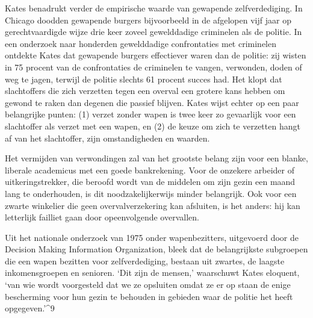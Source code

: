 \documentclass[
  a5paper,
  smalldemyvopaper,10pt,twoside,onecolumn,openright,extrafontsizes,hidelinks]{memoir}
\renewenvironment{quote}%
               {\list{}{\rightmargin=.6cm\leftmargin=.6cm}%
                \itshape \item[]}%
               {\endlist}
\begin{document}
Kates benadrukt verder de empirische waarde van gewapende
zelfverdediging. In Chicago doodden gewapende burgers bijvoorbeeld in de
afgelopen vijf jaar op gerechtvaardigde wijze drie keer zoveel
gewelddadige criminelen als de politie. In een onderzoek naar honderden
gewelddadige confrontaties met criminelen ontdekte Kates dat gewapende
burgers effectiever waren dan de politie: zij wisten in 75 procent van
de confrontaties de criminelen te vangen, verwonden, doden of weg te
jagen, terwijl de politie slechts 61 procent succes had. Het klopt dat
slachtoffers die zich verzetten tegen een overval een grotere kans
hebben om gewond te raken dan degenen die passief blijven. Kates wijst
echter op een paar belangrijke punten: (1) verzet zonder wapen is twee
keer zo gevaarlijk voor een slachtoffer als verzet met een wapen, en (2)
de keuze om zich te verzetten hangt af van het slachtoffer, zijn
omstandigheden en waarden.

\begin{quote}
Het vermijden van verwondingen zal van het grootste belang zijn voor een
blanke, liberale academicus met een goede bankrekening. Voor de onzekere
arbeider of uitkeringstrekker, die beroofd wordt van de middelen om zijn
gezin een maand lang te onderhouden, is dit noodzakelijkerwijs minder
belangrijk. Ook voor een zwarte winkelier die geen overvalverzekering
kan afsluiten, is het anders: hij kan letterlijk failliet gaan door
opeenvolgende overvallen.
\end{quote}

Uit het nationale onderzoek van 1975 onder wapenbezitters, uitgevoerd
door de Decision Making Information Organization, bleek dat de
belangrijkste subgroepen die een wapen bezitten voor zelfverdediging,
bestaan uit zwartes, de laagste inkomensgroepen en senioren. `Dit zijn
de mensen,' waarschuwt Kates eloquent, `van wie wordt voorgesteld dat we
ze opsluiten omdat ze er op staan de enige bescherming voor hun gezin te
behouden in gebieden waar de politie het heeft opgegeven.'\^{}9
\end{document}
